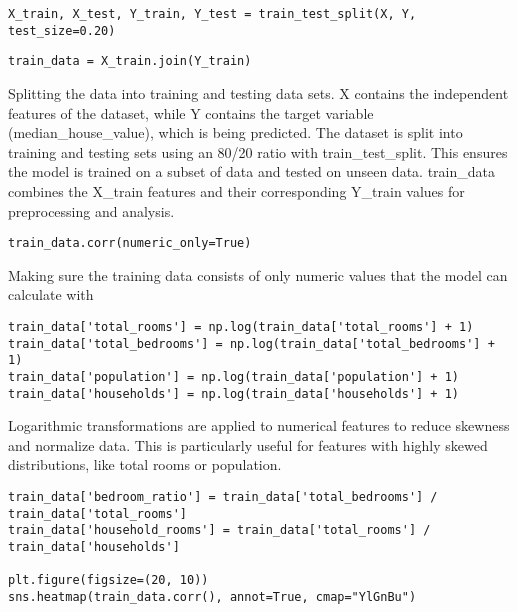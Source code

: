 \documentclass{article}
\begin{document}
\begin{verbatim}
X_train, X_test, Y_train, Y_test = train_test_split(X, Y, 
test_size=0.20)
\end{verbatim}

\begin{verbatim}
train_data = X_train.join(Y_train)
\end{verbatim}

\begin{center}Splitting the data into training and testing data sets. X contains the independent features of the dataset, while Y contains the target variable (median\_house\_value), which is being predicted. The dataset is split into training and testing sets using an 80/20 ratio with train\_test\_split. This ensures the model is trained on a subset of data and tested on unseen data. train\_data combines the X\_train features and their corresponding Y\_train values for preprocessing and analysis.
\end{center}
 
\begin{verbatim}
train_data.corr(numeric_only=True)
\end{verbatim}

\begin{center}
Making sure the training data consists of only numeric values that the model can calculate with
\end{center}

 \begin{verbatim}
train_data['total_rooms'] = np.log(train_data['total_rooms'] + 1)
train_data['total_bedrooms'] = np.log(train_data['total_bedrooms'] + 1)
train_data['population'] = np.log(train_data['population'] + 1)
train_data['households'] = np.log(train_data['households'] + 1)
\end{verbatim}

\begin{center}Logarithmic transformations are applied to numerical features to reduce skewness and normalize data. This is particularly useful for features with highly skewed distributions, like total rooms or population.
\end{center}

\begin{verbatim}
train_data['bedroom_ratio'] = train_data['total_bedrooms'] / train_data['total_rooms']
train_data['household_rooms'] = train_data['total_rooms'] / train_data['households']

plt.figure(figsize=(20, 10))
sns.heatmap(train_data.corr(), annot=True, cmap="YlGnBu")
\end{verbatim}
\end{document}
